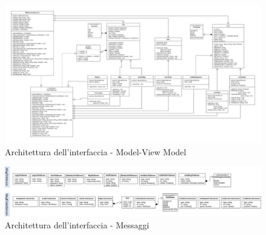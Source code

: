 	\begin{landscape}
		\begin{figure}[h!]
			\includegraphics[width=24cm]{img/ui_component.png}
			\caption{Architettura dell'interfaccia - Model-View Model}
		\end{figure}
	\end{landscape}
	\newpage

	\begin{landscape}
		\begin{figure}[h!]
			\includegraphics[width=24cm]{img/ui_messaggi.png}
			\caption{Architettura dell'interfaccia - Messaggi}
		\end{figure}
	\end{landscape}

